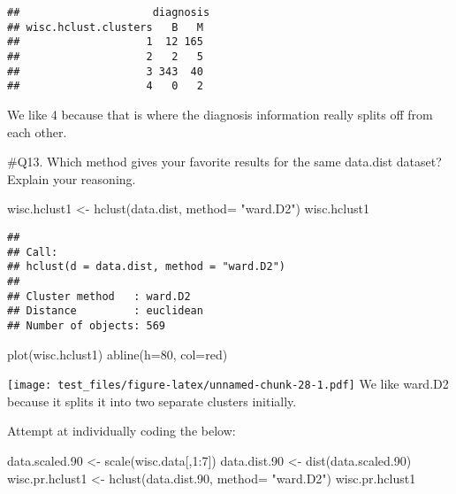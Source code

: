 \documentclass[
]{article}
\newenvironment{Shaded}{\begin{snugshade}}{\end{snugshade}}
\newcommand{\AttributeTok}[1]{\textcolor[rgb]{0.77,0.63,0.00}{#1}}
\newcommand{\DecValTok}[1]{\textcolor[rgb]{0.00,0.00,0.81}{#1}}
\newcommand{\FloatTok}[1]{\textcolor[rgb]{0.00,0.00,0.81}{#1}}
\newcommand{\FunctionTok}[1]{\textcolor[rgb]{0.00,0.00,0.00}{#1}}
\newcommand{\NormalTok}[1]{#1}
\newcommand{\OtherTok}[1]{\textcolor[rgb]{0.56,0.35,0.01}{#1}}
\newcommand{\SpecialCharTok}[1]{\textcolor[rgb]{0.00,0.00,0.00}{#1}}
\newcommand{\StringTok}[1]{\textcolor[rgb]{0.31,0.60,0.02}{#1}}
\begin{document}
\begin{verbatim}
##                     diagnosis
## wisc.hclust.clusters   B   M
##                    1  12 165
##                    2   2   5
##                    3 343  40
##                    4   0   2
\end{verbatim}

We like 4 because that is where the diagnosis information really splits
off from each other.

\#Q13. Which method gives your favorite results for the same data.dist
dataset? Explain your reasoning.

\begin{Shaded}
\begin{Highlighting}[]
\NormalTok{wisc.hclust1 }\OtherTok{\textless{}{-}} \FunctionTok{hclust}\NormalTok{(data.dist, }\AttributeTok{method=} \StringTok{"ward.D2"}\NormalTok{)}
\NormalTok{wisc.hclust1}
\end{Highlighting}
\end{Shaded}

\begin{verbatim}
## 
## Call:
## hclust(d = data.dist, method = "ward.D2")
## 
## Cluster method   : ward.D2 
## Distance         : euclidean 
## Number of objects: 569
\end{verbatim}

\begin{Shaded}
\begin{Highlighting}[]
\FunctionTok{plot}\NormalTok{(wisc.hclust1)}
\FunctionTok{abline}\NormalTok{(}\AttributeTok{h=}\DecValTok{80}\NormalTok{, }\AttributeTok{col=}\StringTok{\textquotesingle{}red\textquotesingle{}}\NormalTok{)}
\end{Highlighting}
\end{Shaded}

\texttt{[image: test\_files/figure-latex/unnamed-chunk-28-1.pdf]} We like
ward.D2 because it splits it into two separate clusters initially.

Attempt at individually coding the below:

\begin{Shaded}
\begin{Highlighting}[]
\NormalTok{data.scaled}\FloatTok{.90} \OtherTok{\textless{}{-}} \FunctionTok{scale}\NormalTok{(wisc.data[,}\DecValTok{1}\SpecialCharTok{:}\DecValTok{7}\NormalTok{])}
\NormalTok{data.dist}\FloatTok{.90} \OtherTok{\textless{}{-}} \FunctionTok{dist}\NormalTok{(data.scaled}\FloatTok{.90}\NormalTok{)}
\NormalTok{wisc.pr.hclust1 }\OtherTok{\textless{}{-}} \FunctionTok{hclust}\NormalTok{(data.dist}\FloatTok{.90}\NormalTok{, }\AttributeTok{method=} \StringTok{"ward.D2"}\NormalTok{)}
\NormalTok{wisc.pr.hclust1}
\end{Highlighting}
\end{Shaded}
\end{document}
